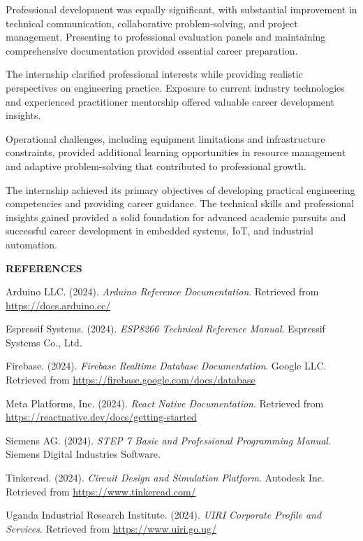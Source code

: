 \documentclass[12pt,a4paper]{report}
\begin{document}
\noindent Professional development was equally significant, with substantial improvement in technical communication, collaborative problem-solving, and project management. Presenting to professional evaluation panels and maintaining comprehensive documentation provided essential career preparation.

\noindent The internship clarified professional interests while providing realistic perspectives on engineering practice. Exposure to current industry technologies and experienced practitioner mentorship offered valuable career development insights.

\noindent Operational challenges, including equipment limitations and infrastructure constraints, provided additional learning opportunities in resource management and adaptive problem-solving that contributed to professional growth.

\noindent The internship achieved its primary objectives of developing practical engineering competencies and providing career guidance. The technical skills and professional insights gained provided a solid foundation for advanced academic pursuits and successful career development in embedded systems, IoT, and industrial automation.

\newpage
{\fontsize{14}{16.8}\selectfont\bfseries\centering REFERENCES\par}
\vspace{10pt}

\noindent Arduino LLC. (2024). \textit{Arduino Reference Documentation}. Retrieved from \url{https://docs.arduino.cc/}

\noindent Espressif Systems. (2024). \textit{ESP8266 Technical Reference Manual}. Espressif Systems Co., Ltd.

\noindent Firebase. (2024). \textit{Firebase Realtime Database Documentation}. Google LLC. Retrieved from \url{https://firebase.google.com/docs/database}

\noindent Meta Platforms, Inc. (2024). \textit{React Native Documentation}. Retrieved from \url{https://reactnative.dev/docs/getting-started}

\noindent Siemens AG. (2024). \textit{STEP 7 Basic and Professional Programming Manual}. Siemens Digital Industries Software.

\noindent Tinkercad. (2024). \textit{Circuit Design and Simulation Platform}. Autodesk Inc. Retrieved from \url{https://www.tinkercad.com/}

\noindent Uganda Industrial Research Institute. (2024). \textit{UIRI Corporate Profile and Services}. Retrieved from \url{https://www.uiri.go.ug/}
\end{document}
